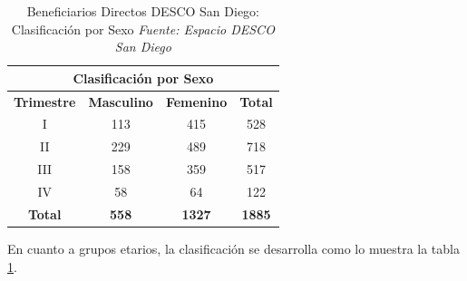 \documentclass[11pt, a4paper, twosides]{report}
\begin{document}
\begin{table}[h]
	\centering
	\begin{tabular}{|c|c|c|c|}
		\hline
		\multicolumn{4}{|c|}{\cellcolor{gray75} \textbf{Clasificación por Sexo}}                        \\ \hline
		\textbf{Trimestre} & \textbf{Masculino} & \textbf{Femenino} & \textbf{Total} \\ \hline
		I                  & 113                & 415               & 528            \\ \hline
		II                 & 229                & 489               & 718            \\ \hline
		III                & 158                & 359               & 517            \\ \hline
		IV                 & 58                 & 64                & 122            \\ \hline
		\textbf{Total}     & \textbf{558}       & \textbf{1327}     & \textbf{1885}  \\ \hline
	\end{tabular}
	\caption{Beneficiarios Directos DESCO San Diego: Clasificación por Sexo \textit{Fuente: Espacio DESCO San Diego}}
	\label{tabla3}
\end{table}
En cuanto a grupos etarios, la clasificación se desarrolla como lo muestra la tabla \ref{tabla3}.
\end{document}
